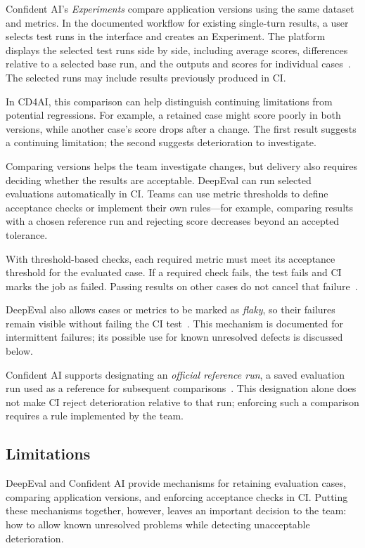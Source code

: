 Confident AI's \emph{Experiments} compare application versions using the same
dataset and metrics. In the documented workflow for existing single-turn
results, a user selects test runs in the interface and creates an Experiment.
The platform displays the selected test runs side by side, including average
scores, differences relative to a selected base run, and the outputs and scores
for individual cases~\parencite{ConfidentAI:Experiments}. The selected runs
may include results previously produced in CI.

In CD4AI, this comparison can help distinguish continuing limitations from
potential regressions. For example, a retained case might score poorly in both
versions, while another case's score drops after a change. The first result
suggests a continuing limitation; the second suggests deterioration to
investigate.

Comparing versions helps the team investigate changes, but delivery also
requires deciding whether the results are acceptable. DeepEval can run
selected evaluations automatically in CI. Teams can use metric thresholds to
define acceptance checks or implement their own rules---for example,
comparing results with a chosen reference run and rejecting score decreases
beyond an accepted tolerance.

With threshold-based checks, each required metric must meet its acceptance
threshold for the evaluated case. If a required check fails, the test fails
and CI marks the job as failed. Passing results on other cases do not cancel that
failure~\parencite{DeepEval:CI}.

DeepEval also allows cases or metrics to be marked as \emph{flaky}, so their
failures remain visible without failing the CI
test~\parencite{DeepEval:CI}. This mechanism is documented for intermittent
failures; its possible use for known unresolved defects is discussed below.

Confident AI supports designating an \emph{official reference run}, a saved evaluation
run used as a reference for subsequent comparisons~\parencite{DeepEval:CI}.
This designation alone does not make CI reject deterioration relative to that
run; enforcing such a comparison requires a rule implemented by the team.

\subsection{Limitations}

DeepEval and Confident AI provide mechanisms for retaining evaluation cases,
comparing application versions, and enforcing acceptance checks in CI. Putting
these mechanisms together, however, leaves an important decision to the team:
how to allow known unresolved problems while detecting unacceptable
deterioration.

